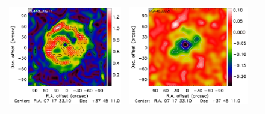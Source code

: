 \documentclass[traditabstract]{aa}
\begin{document}
\begin{figure}[h]
{\begin{tabular}{lll}
\includegraphics[trim=2.3cm 2.2cm 0cm 0cm, clip=true, scale=1]{Figure/Grad_RG448_00211_Ymap_zobs0p4_processed_15_15_45.pdf} & 
\includegraphics[trim=2.3cm 2.2cm 0cm 0cm, clip=true, scale=1]{Figure/DoG_RG448_00211_Ymap_zobs0p4_processed_15_15_45.pdf} \\

\end{tabular}}
\end{figure}
\end{document}
